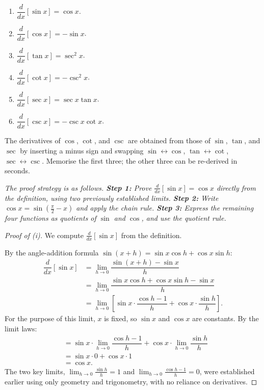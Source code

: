 \begin{theorem}
\label{thm:3-6}
\begin{enumerate}[label=(\roman*)]
  \item $\dfrac{d}{dx}[\sin x] = \cos x$. \qquad
  \item $\dfrac{d}{dx}[\cos x] = -\sin x$.
  \item $\dfrac{d}{dx}[\tan x] = \sec^{2} x$. \qquad
  \item $\dfrac{d}{dx}[\cot x] = -\csc^{2} x$.
  \item $\dfrac{d}{dx}[\sec x] = \sec x \tan x$. \qquad
  \item $\dfrac{d}{dx}[\csc x] = -\csc x \cot x$.
\end{enumerate}
\end{theorem}

\begin{remark}
The derivatives of $\cos$, $\cot$, and $\csc$ are obtained from those of $\sin$, $\tan$, and $\sec$ by inserting a minus sign and swapping $\sin \leftrightarrow \cos$, $\tan \leftrightarrow \cot$, $\sec \leftrightarrow \csc$.  Memorise the first three; the other three can be re-derived in seconds.
\end{remark}

\textit{The proof strategy is as follows.  \textbf{Step 1:} Prove $\frac{d}{dx}[\sin x] = \cos x$ directly from the definition, using two previously established limits.  \textbf{Step 2:} Write $\cos x = \sin\!\left(\frac{\pi}{2} - x\right)$ and apply the chain rule.  \textbf{Step 3:} Express the remaining four functions as quotients of $\sin$ and $\cos$, and use the quotient rule.}

\begin{proof}[Proof of \emph{(i)}]
We compute $\frac{d}{dx}[\sin x]$ from the definition.

By the angle-addition formula $\sin(x+h) = \sin x \cos h + \cos x \sin h$:
\begin{align*}
  \dfrac{d}{dx}[\sin x]
  &= \lim_{h \to 0} \dfrac{\sin(x+h) - \sin x}{h} \\
  &= \lim_{h \to 0} \dfrac{\sin x \cos h + \cos x \sin h - \sin x}{h} \\
  &= \lim_{h \to 0} \left[\sin x \cdot \dfrac{\cos h - 1}{h} + \cos x \cdot \dfrac{\sin h}{h}\right].
\end{align*}
For the purpose of this limit, $x$ is fixed, so $\sin x$ and $\cos x$ are constants.  By the limit laws:
\begin{align*}
  &= \sin x \cdot \lim_{h \to 0} \dfrac{\cos h - 1}{h} + \cos x \cdot \lim_{h \to 0} \dfrac{\sin h}{h} \\
  &= \sin x \cdot 0 + \cos x \cdot 1 \\
  &= \cos x.
\end{align*}
The two key limits, $\lim_{h \to 0}\frac{\sin h}{h} = 1$ and $\lim_{h \to 0}\frac{\cos h - 1}{h} = 0$, were established earlier using only geometry and trigonometry, with no reliance on derivatives.
\end{proof}

